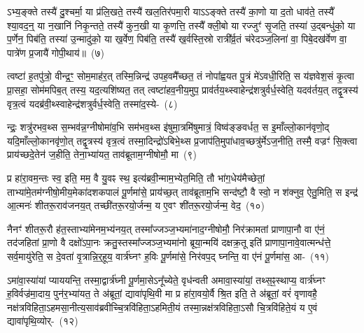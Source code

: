 ऽभ्य॒ङ्क्ते तस्यै॑ दु॒श्चर्मा॒ या प्र॑लि॒खते॒ तस्यै॑ खल॒तिर॑पमा॒री या\-ऽ\-ऽङ्क्ते तस्यै॑ का॒णो या द॒तो धाव॑ते॒ तस्यै᳚ श्या॒वद॒न्॒ या न॒खानि॑ निकृ॒न्तते॒ तस्यै॑ कुन॒खी या कृ॒णत्ति॒ तस्यै᳚ क्ली॒बो या रज्जुꣳ॑ सृ॒जति॒ तस्या॑ उ॒द्बन्धु॑को॒ या प॒र्णेन॒ पिब॑ति॒ तस्या॑ उ॒न्मादु॑को॒ या ख॒र्वेण॒ पिब॑ति॒ तस्यै॑ ख॒र्वस्ति॒स्रो रात्री᳚र्व्र॒तं च॑रेदञ्ज॒लिना॑ वा॒ पिबे॒दख॑र्वेण वा॒ पात्रे॑ण प्र॒जायै॑ गोपी॒थाय॑॥~(७)

{\anuvakamend[{यथ्सो॑म॒पान॑न्ते वृ॒क्णात् तस्य॒ नाश्यं॑ वदेत॒ मारु॑को॒ या\-ऽख॑र्वेण वा॒ त्रीणि॑ च}]}%

त्वष्टा॑ ह॒तपु॑त्रो॒ वीन्द्र॒ꣳ॒ सोम॒माह॑र॒त् तस्मि॒न्निन्द्र॑ उपह॒वमै᳚च्छत॒ तं नोपा᳚ह्वयत पु॒त्रं मे॑\-ऽवधी॒रिति॒ स य॑ज्ञवेश॒सं कृ॒त्वा प्रा॒सहा॒ सोम॑मपिब॒त् तस्य॒ यद॒त्यशि॑ष्यत॒ तत् त्वष्टा॑हव॒नीय॒मुप॒ प्राव॑र्तय॒थ्\-स्वाहेन्द्र॑शत्रुर्वर्ध॒स्वेति॒ यदव॑र्तय॒त् तद्वृ॒त्रस्य॑ वृत्र॒त्वं यदब्र॑वी॒थ्\-स्वाहेन्द्र॑शत्रुर्वर्ध॒स्वेति॒ तस्मा॑द॒स्ये-~(८)

न्द्रः॒ शत्रु॑रभव॒थ्स स॒म्भव॑न्न॒ग्नी\-षोमा॑व॒भि सम॑भव॒थ्स इ॑षुमा॒त्रमि॑षुमात्रं॒ विष्व॑ङ्ङवर्धत॒ स इ॒माँल्लो॒कान॑वृणो॒द् यदि॒माँल्लो॒का\-नवृ॑णो॒त् तद्वृ॒त्रस्य॑ वृत्र॒त्वं तस्मा॒दिन्द्रो॑\-ऽबिभे॒थ्स प्र॒जा\-प॑ति॒मुपा॑\-धाव॒च्छत्रु॑र्मे\-ऽज॒नीति॒ तस्मै॒ वज्रꣳ॑ सि॒क्त्वा प्राय॑च्छदे॒तेन॑ ज॒हीति॒ तेना॒भ्या॑यत॒ ताव॑ब्रूताम॒ग्नी\-षोमौ॒ मा~(९)

प्र हा॑रा॒वम॒न्तः स्व॒ इति॒ मम॒ वै यु॒वꣴ स्थ॒ इत्य॑ब्रवी॒न्माम॒भ्ये\-त॒मिति॒ तौ भा॑ग॒धेय॑मैच्छेतां॒ ताभ्या॑मे॒त\-म॑ग्नीषो॒मीय॒\-मेका॑\-दश\-कपालं पू॒र्णमा॑से॒ प्राय॑च्छ॒त् ताव॑ब्रूताम॒भि सन्द॑ष्टौ॒ वै स्वो॒ न श॑क्नुव॒ ऐतु॒मिति॒ स इन्द्र॑ आ॒त्मनः॑ शीतरू॒राव॑जनय॒त् तच्छी॑तरू॒रयो॒र्जन्म॒ य ए॒वꣳ शी॑तरू॒रयो॒र्जन्म॒ वेद॒~(१०)


नैनꣳ॑ शीतरू॒रौ ह॑त॒स्ताभ्या॑मेनम॒भ्य॑नय॒त् तस्मा᳚ज्जञ्ज॒भ्यमा॑\-नाद॒ग्नी\-षोमौ॒ निर॑क्रामतां प्राणापा॒नौ वा ए॑नं॒ तद॑जहितां प्रा॒णो वै दक्षो॑\-ऽपा॒नः क्रतु॒स्तस्मा᳚ज्जञ्ज॒भ्यमा॑नो ब्रूया॒न्मयि॑ दक्षक्र॒तू इति॑ प्राणापा॒नावे॒वात्मन्ध॑त्ते॒ सर्व॒मायु॑रेति॒ स दे॒वता॑ वृ॒त्रान्नि॒र्॒\mbox{}हूय॒ वार्त्र॑घ्नꣳ ह॒विः पू॒र्णमा॑से॒ निर॑वप॒द् घ्नन्ति॒ वा ए॑नं पू॒र्णमा॑स॒ आ-~(११)

ऽमा॑वा॒स्या॑यां प्याययन्ति॒ तस्मा॒द्वार्त्र॑घ्नी पू॒र्णमा॒से\-ऽनू᳚च्येते॒ वृध॑न्वती अमावा॒स्या॑यां॒ तथ्स॒ꣴ॒स्थाप्य॒ वार्त्र॑घ्नꣳ ह॒विर्वज्र॑मा॒दाय॒ पुन॑र॒भ्या॑यत॒ ते अ॑ब्रूतां॒ द्यावा॑पृथि॒वी मा प्र हा॑रा॒वयो॒र्वै श्रि॒त इति॒ ते अ॑ब्रूतां॒ वरं॑ वृणावहै॒ नक्ष॑त्रविहिता॒\-ऽहमसा॒नीत्य॒साव॑ब्रवीच्चि॒त्रवि॑हिता॒\-ऽहमिती॒यं तस्मा॒न्नक्ष॑त्रविहिता॒\-ऽसौ चि॒त्रवि॑हिते॒यं य ए॒वं द्यावा॑पृथि॒व्योर्-~(१२)

